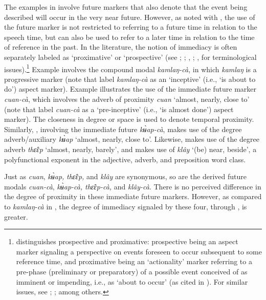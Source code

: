 \documentclass[output=paper,colorlinks,citecolor=brown]{langscibook}
\begin{document}
The examples in  involve future markers that also denote that the event being described will occur in the very near future. However, as \citet[69]{Smyth2002} noted with , the use of the future marker is not restricted to referring to a future time in relation to the speech time, but can also be used to refer to a later time in relation to the time of reference in the past. In the literature, the notion of immediacy is often separately labeled as ‘proximative’ or ‘prospective’ (see \cite{Heine1994}; \cite{Johanson2017}; \cite{Nevskaya2005}, \citeyear{Nevskaya2015}; \cite{Kuteva2019}, for terminological issues).\footnote{\citet[]{Johanson2017} distinguishes prospective and proximative: prospective being an aspect marker signaling a perspective on events foreseen to occur subsequent to some reference time, and proximative being an ‘actionality’ marker referring to a pre-phase (preliminary or preparatory) of a possible event conceived of as imminent or impending, i.e., as ‘about to occur’ (as cited in \cite{Nevskaya2015}). For similar issues, see \citet[64]{Comrie1976}; \citet[111--112]{Dahl1985}; among others.} Example  involves the compound modal \textit{kamlaŋ-cà}, in which \textit{kamlaŋ} is a progressive marker (note that \citealt[149]{IwasakiIngkaphirom2005} label \textit{kamlaŋ-cà} as an ‘inceptive’ (i.e., ‘is about to do’) aspect marker). Example  illustrates the use of the immediate future marker \textit{cuan-cà}, which involves the adverb of proximity \textit{cuan} ‘almost, nearly, close to’ (note that \citet[149]{IwasakiIngkaphirom2005} label \textit{cuan-cà} as a ‘pre-inceptive’ (i.e., ‘is almost done’) aspect marker). The closeness in degree or space is used to denote temporal proximity. Similarly, , involving the immediate future \textit{kʉ̀ap-cà}, makes use of the degree adverb/auxiliary \textit{kʉ̀ap} ‘almost, nearly, close to’. Likewise,  makes use of the degree adverb \textit{thɛ̂ɛp} ‘almost, nearly, barely’, and  makes use of \textit{klây} ‘(be) near, beside’, a polyfunctional exponent in the adjective, adverb, and preposition word class. 

Just as \textit{cuan}, \textit{kʉ̀ap}\textit{, }\textit{thɛ̂ɛp}\textit{, }and \textit{klây} are synonymous, so are the derived future modals \textit{cuan-cà}, \textit{kʉ̀ap-cà}\textit{, }\textit{thɛ̂ɛp-cà}\textit{, }and \textit{klây-cà}. There is no perceived difference in the degree of proximity in these immediate future markers. However, as compared to \textit{kamlaŋ-cà} in , the degree of immediacy signaled by these four,  through , is greater. 
\end{document}
